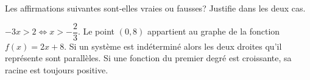 %
%
    Les affirmations suivantes sont-elles vraies ou fausses? Justifie dans les deux cas.
    \begin{tasks}
        \task \(-3x > 2 \Leftrightarrow x > -\dfrac{2}{3}\).
        \task Le point $(0,8)$ appartient au graphe de la fonction $f(x)=2x + 8$.
        \task Si un système est indéterminé alors les deux droites qu'il représente sont parallèles.
        \task Si une fonction du premier degré est croissante, sa racine est toujours positive.
    \end{tasks}
